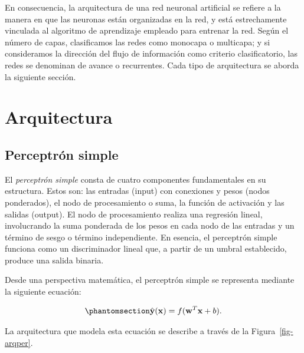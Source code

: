 \documentclass[
  us-letterpaper,
]{scrreprt}
\theoremstyle{definition}
\theoremstyle{plain}
\theoremstyle{plain}
\theoremstyle{definition}
\theoremstyle{remark}
\begin{document}
En consecuencia, la arquitectura de una red neuronal artificial se
refiere a la manera en que las neuronas están organizadas en la red, y
está estrechamente vinculada al algoritmo de aprendizaje empleado para
entrenar la red. Según el número de capas, clasificamos las redes como
monocapa o multicapa; y si consideramos la dirección del flujo de
información como criterio clasificatorio, las redes se denominan de
avance o recurrentes. Cada tipo de arquitectura se aborda la siguiente
sección.

\section{Arquitectura}\label{arquitectura}

\subsection{Perceptrón simple}\label{perceptruxf3n-simple}

El \emph{perceptrón simple} consta de cuatro componentes fundamentales
en su estructura. Estos son: las entradas (input) con conexiones y pesos
(nodos ponderados), el nodo de procesamiento o suma, la función de
activación y las salidas (output). El nodo de procesamiento realiza una
regresión lineal, involucrando la suma ponderada de los pesos en cada
nodo de las entradas y un término de sesgo o término independiente. En
esencia, el perceptrón simple funciona como un discriminador lineal que,
a partir de un umbral establecido, produce una salida binaria.

Desde una perspectiva matemática, el perceptrón simple se representa
mediante la siguiente ecuación:

\begin{equation}\phantomsection\label{eq-perceptron}{
\hat{\mathbf{y}}(\mathbf x)=f(\mathbf w^T\mathbf x+b).
}\end{equation}

La arquitectura que modela esta ecuación se describe a través de la
Figura~\ref{fig-arqper}.
\end{document}
